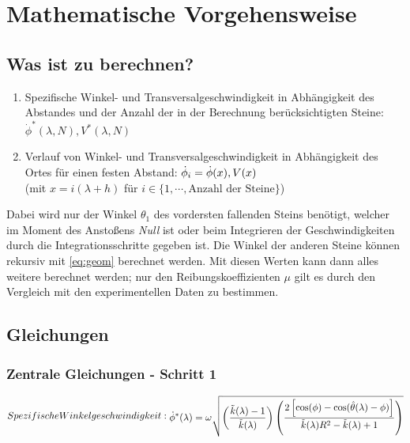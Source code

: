 \section{Mathematische Vorgehensweise \label{MathVorg}}

\setcounter{equation}{0}
\renewcommand{\theequation}{\Roman{equation}}

\subsection{Was ist zu berechnen?}
\begin{enumerate}
    \item Spezifische Winkel- und Transversalgeschwindigkeit in Abhängigkeit
        des Abstandes und der Anzahl der in der Berechnung berücksichtigten
        Steine:
        $\dot{\phi}^*(\lambda, N), V^*(\lambda, N)$
    \item Verlauf von Winkel- und Transversalgeschwindigkeit in Abhängigkeit
        des Ortes für einen festen Abstand:
        $\dot{\phi}_i = \dot{\phi}(x), V(x)$\\
        (mit $x = i(\lambda + h)$ für $i \in \{1, \cdots, \text{Anzahl
        der Steine}\}$)
\end{enumerate}
Dabei wird nur der Winkel $\theta_1$ des vordersten fallenden Steins benötigt,
welcher im Moment des Anstoßens \textit{Null} ist oder beim Integrieren der
Geschwindigkeiten durch die Integrationsschritte gegeben ist. Die Winkel der
anderen Steine können rekursiv mit \eqref{eq:geom} berechnet werden. Mit
diesen Werten kann dann alles weitere berechnet werden; nur den
Reibungskoeffizienten $\mu$ gilt es durch den Vergleich mit den experimentellen
Daten zu bestimmen.

\subsection{Gleichungen}
\subsubsection{Zentrale Gleichungen - Schritt 1}
\begin{subequations}
    Spezifische Winkelgeschwindigkeit:
    \begin{align}
    \phistar = \omega \sqrt{\left(
        \frac{\kl-1}{\kl} \right) \left( \frac{2\left[
    \cos(\phi)-\cos(\hat{\theta}(\lambda)-\phi)\right]}{\kl R^2 -\kl+1} \right)}
    \end{align}
\end{subequations}

